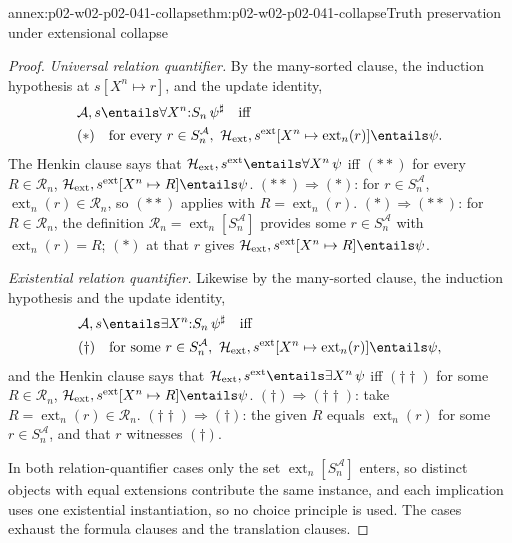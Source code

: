 \begin{annexitem}{annex:p02-w02-p02-041-collapse}{thm:p02-w02-p02-041-collapse}{Truth preservation under extensional collapse}
\begin{proof}
\emph{Universal relation quantifier.}  By the many-sorted clause, the
induction hypothesis at \(s[X^n\mapsto r]\), and the update identity,
\[
\begin{aligned}
 &\mathcal A,s\entails\forall X^n{:}S_n\,\psi^\sharp
 \quad\text{iff}\\
 &(\ast)\quad\text{for every }r\in S_n^{\mathcal A},\
 \mathcal H_{\mathrm{ext}},s^{\mathrm{ext}}[X^n\mapsto\operatorname{ext}_n(r)]\entails\psi .
\end{aligned}
\]
The Henkin clause says that
\(\mathcal H_{\mathrm{ext}},s^{\mathrm{ext}}\entails\forall X^n\,\psi\) iff
\((\ast\ast)\) for every \(R\in\mathcal R_n\),
\(\mathcal H_{\mathrm{ext}},s^{\mathrm{ext}}[X^n\mapsto R]\entails\psi\).
\((\ast\ast)\Rightarrow(\ast)\): for \(r\in S_n^{\mathcal A}\),
\(\operatorname{ext}_n(r)\in\mathcal R_n\), so \((\ast\ast)\) applies with
\(R=\operatorname{ext}_n(r)\).  \((\ast)\Rightarrow(\ast\ast)\): for
\(R\in\mathcal R_n\), the definition
\(\mathcal R_n=\operatorname{ext}_n[S_n^{\mathcal A}]\) provides some
\(r\in S_n^{\mathcal A}\) with \(\operatorname{ext}_n(r)=R\); \((\ast)\) at
that \(r\) gives \(\mathcal H_{\mathrm{ext}},s^{\mathrm{ext}}[X^n\mapsto
R]\entails\psi\).

\emph{Existential relation quantifier.}  Likewise by the many-sorted clause,
the induction hypothesis and the update identity,
\[
\begin{aligned}
 &\mathcal A,s\entails\exists X^n{:}S_n\,\psi^\sharp
 \quad\text{iff}\\
 &(\dagger)\quad\text{for some }r\in S_n^{\mathcal A},\
 \mathcal H_{\mathrm{ext}},s^{\mathrm{ext}}[X^n\mapsto\operatorname{ext}_n(r)]\entails\psi,
\end{aligned}
\]
and the Henkin clause says that
\(\mathcal H_{\mathrm{ext}},s^{\mathrm{ext}}\entails\exists X^n\,\psi\) iff
\((\dagger\dagger)\) for some \(R\in\mathcal R_n\),
\(\mathcal H_{\mathrm{ext}},s^{\mathrm{ext}}[X^n\mapsto R]\entails\psi\).
\((\dagger)\Rightarrow(\dagger\dagger)\): take
\(R=\operatorname{ext}_n(r)\in\mathcal R_n\).
\((\dagger\dagger)\Rightarrow(\dagger)\): the given \(R\) equals
\(\operatorname{ext}_n(r)\) for some \(r\in S_n^{\mathcal A}\), and that \(r\)
witnesses \((\dagger)\).

In both relation-quantifier cases only the set
\(\operatorname{ext}_n[S_n^{\mathcal A}]\) enters, so distinct objects with
equal extensions contribute the same instance, and each implication uses one
existential instantiation, so no choice principle is used.  The cases exhaust
the formula clauses and the translation clauses.


\end{proof}
\end{annexitem}
